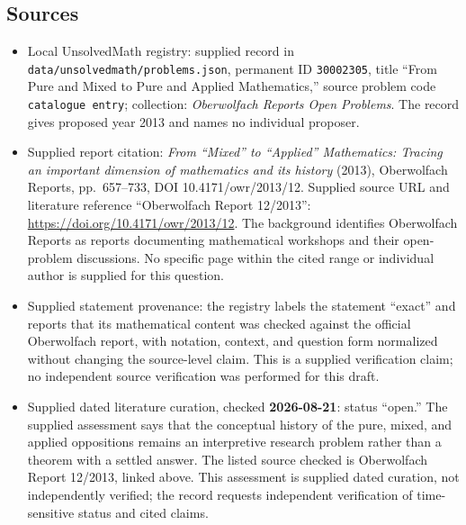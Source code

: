 \documentclass[11pt]{article}
\begin{document}
\subsection{Sources}
\begin{itemize}
\item Local UnsolvedMath registry: supplied record in \texttt{data/unsolvedmath/problems.json}, permanent ID \texttt{30002305}, title ``From Pure and Mixed to Pure and Applied Mathematics,'' source problem code \texttt{catalogue entry}; collection: \emph{Oberwolfach Reports Open Problems}. The record gives proposed year 2013 and names no individual proposer.
\item Supplied report citation: \emph{From ``Mixed'' to ``Applied'' Mathematics: Tracing an important dimension of mathematics and its history} (2013), Oberwolfach Reports, pp.~657--733, DOI 10.4171/owr/2013/12. Supplied source URL and literature reference ``Oberwolfach Report 12/2013'': \url{https://doi.org/10.4171/owr/2013/12}. The background identifies Oberwolfach Reports as reports documenting mathematical workshops and their open-problem discussions. No specific page within the cited range or individual author is supplied for this question.
\item Supplied statement provenance: the registry labels the statement ``exact'' and reports that its mathematical content was checked against the official Oberwolfach report, with notation, context, and question form normalized without changing the source-level claim. This is a supplied verification claim; no independent source verification was performed for this draft.
\item Supplied dated literature curation, checked \textbf{2026-08-21}: status ``open.'' The supplied assessment says that the conceptual history of the pure, mixed, and applied oppositions remains an interpretive research problem rather than a theorem with a settled answer. The listed source checked is Oberwolfach Report 12/2013, linked above. This assessment is supplied dated curation, not independently verified; the record requests independent verification of time-sensitive status and cited claims.
\end{itemize}
\end{document}
